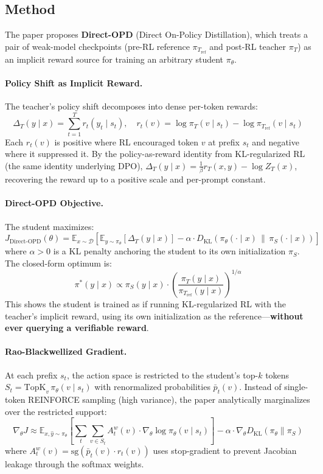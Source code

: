 \documentclass[11pt,a4paper]{article}
\begin{document}
\subsection{Method}

The paper proposes \textbf{Direct-OPD} (Direct On-Policy Distillation), which treats a pair of weak-model checkpoints (pre-RL reference $\pi_{T_\mathrm{ref}}$ and post-RL teacher $\pi_T$) as an implicit reward source for training an arbitrary student $\pi_\theta$.

\paragraph{Policy Shift as Implicit Reward.} The teacher's policy shift decomposes into dense per-token rewards:
\[
\Delta_T(y \mid x) = \sum_{t=1}^{T} r_t(y_t \mid s_t), \quad r_t(v) = \log \pi_T(v \mid s_t) - \log \pi_{T_\mathrm{ref}}(v \mid s_t)
\]
Each $r_t(v)$ is positive where RL encouraged token $v$ at prefix $s_t$ and negative where it suppressed it. By the policy-as-reward identity from KL-regularized RL (the same identity underlying DPO), $\Delta_T(y \mid x) = \frac{1}{\beta} r_T(x, y) - \log Z_T(x)$, recovering the reward up to a positive scale and per-prompt constant.

\paragraph{Direct-OPD Objective.} The student maximizes:
\[
J_{\mathrm{Direct\text{-}OPD}}(\theta) = \mathbb{E}_{x \sim \mathcal{D}}\left[\mathbb{E}_{y \sim \pi_\theta}\left[\Delta_T(y \mid x)\right] - \alpha \cdot D_{\mathrm{KL}}\!\left(\pi_\theta(\cdot \mid x) \,\|\, \pi_S(\cdot \mid x)\right)\right]
\]
where $\alpha > 0$ is a KL penalty anchoring the student to its own initialization $\pi_S$. The closed-form optimum is:
\[
\pi^*(y \mid x) \propto \pi_S(y \mid x) \cdot \left(\frac{\pi_T(y \mid x)}{\pi_{T_\mathrm{ref}}(y \mid x)}\right)^{1/\alpha}
\]
This shows the student is trained as if running KL-regularized RL with the teacher's implicit reward, using its own initialization as the reference---\textbf{without ever querying a verifiable reward}.

\paragraph{Rao-Blackwellized Gradient.} At each prefix $s_t$, the action space is restricted to the student's top-$k$ tokens $S_t = \mathrm{TopK}_v\, \pi_\theta(v \mid s_t)$ with renormalized probabilities $\bar{p}_t(v)$. Instead of single-token REINFORCE sampling (high variance), the paper analytically marginalizes over the restricted support:
\[
\nabla_\theta J \approx \mathbb{E}_{x, \hat{y} \sim \pi_\theta}\!\left[\sum_t \sum_{v \in S_t} A_t^w(v) \cdot \nabla_\theta \log \pi_\theta(v \mid s_t)\right] - \alpha \cdot \nabla_\theta D_{\mathrm{KL}}(\pi_\theta \| \pi_S)
\]
where $A_t^w(v) = \mathrm{sg}\!\left(\bar{p}_t(v) \cdot r_t(v)\right)$ uses stop-gradient to prevent Jacobian leakage through the softmax weights.
\end{document}
